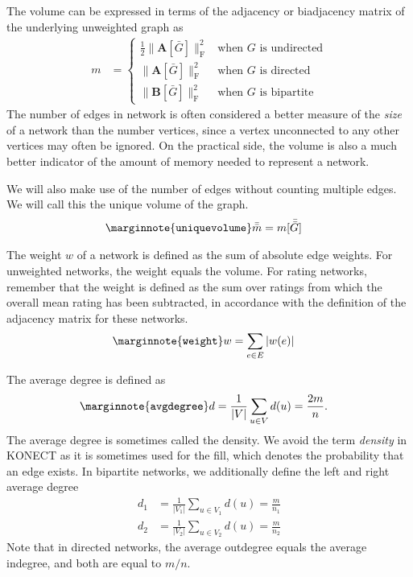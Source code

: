 \documentclass{article}
\begin{document}
The volume can be expressed in terms of
the adjacency or biadjacency matrix of the underlying unweighted graph as
\begin{align}
  m &= \left\{ \begin{array}{ll}
    \frac 1 2 \| \mathbf A[\bar G] \|_{\mathrm F} ^2 &
    \text{when $G$ is undirected} \\
    \| \mathbf A[\bar G] \| _{\mathrm F} ^2 &
    \text{when $G$ is directed} \\
    \| \mathbf B[\bar G] \| _{\mathrm F} ^2 &    
    \text{when $G$ is bipartite}
    \end{array} \right.
\end{align}
The number of edges in network is often considered a better measure of
the \emph{size} of a network than the number vertices, since a vertex
unconnected to any other vertices may often be ignored.  On the
practical side, the volume is also a much better indicator of the amount
of memory needed to represent a network.

We will also make use of the number of edges without counting multiple
edges.  We will call this the unique volume of the graph. 
\begin{align}
  \marginnote{\texttt{uniquevolume}}
  \bar{\bar m} &= m[\bar{\bar{G}}]
\end{align}

The weight $w$ of a network is defined as the sum of absolute edge weights.  For
unweighted networks, the weight equals the volume. For rating networks,
remember that the weight is defined as the sum over ratings from which the overall
mean rating has been subtracted, in accordance with the definition of
the adjacency matrix for these networks. 
\begin{align}
  \marginnote{\texttt{weight}}
  w &= \sum_{e \in E} |w(e)|
\end{align}

The average degree is defined as
\begin{align}
  \marginnote{\texttt{avgdegree}}
  d &= \frac 1 {|V|} \sum_{u\in V} d(u) = \frac {2m} n . 
\end{align}
The average degree is sometimes called the density.  We avoid the term
\emph{density} in KONECT as it is sometimes used for the fill, which
denotes the probability that an edge exists.  In bipartite networks, we
additionally define the left and right average degree
\begin{align}
  d_1 &= \frac 1 {|V_1|} \sum_{u \in V_1} d(u) = \frac m {n_1} \\
  d_2 &= \frac 1 {|V_2|} \sum_{u \in V_2} d(u) = \frac m {n_2} 
\end{align}
Note that in directed networks, the average outdegree equals the average
indegree, and both are equal to $m/n$. 
\end{document}
